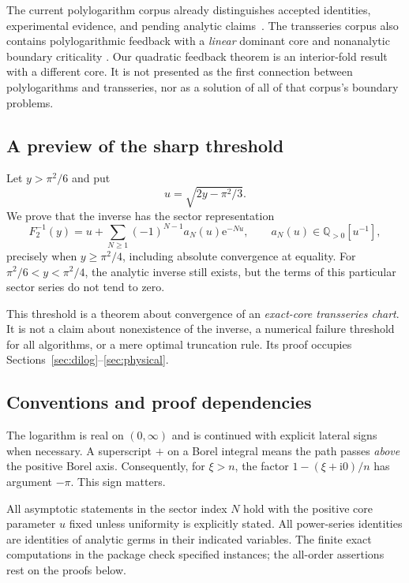 \documentclass[11pt,a4paper]{article}
\theoremstyle{definition}\newtheorem{definition}[theorem]{Definition}
\theoremstyle{remark}\newtheorem{remark}[theorem]{Remark}
\newcommand{\ii}{\mathrm i}
\newcommand{\ee}{\mathrm e}
\newcommand{\Q}{\mathbb Q}
\numberwithin{equation}{section}
\begin{document}
The current polylogarithm corpus already distinguishes accepted identities,
experimental evidence, and pending analytic claims~\cite{RepoPoly}.
The transseries corpus also contains polylogarithmic feedback with a
\emph{linear} dominant core and nonanalytic boundary criticality
\cite{RepoCritical}. Our quadratic feedback theorem is an interior-fold
result with a different core. It is not presented as the first connection
between polylogarithms and transseries, nor as a solution of all of that
corpus's boundary problems.

\subsection{A preview of the sharp threshold}

Let $y>\pi^2/6$ and put
\begin{equation}\label{eq:u-y}
 u=\sqrt{2y-\pi^2/3}.
\end{equation}
We prove that the inverse has the sector representation
\begin{equation}\label{eq:intro-inverse}
 F_2^{-1}(y)=u+\sum_{N\ge1}(-1)^{N-1}a_N(u)\ee^{-Nu},
 \qquad a_N(u)\in\Q_{>0}[u^{-1}],
\end{equation}
precisely when $y\ge\pi^2/4$, including absolute convergence at equality.
For $\pi^2/6<y<\pi^2/4$, the analytic inverse still exists, but the terms of
this particular sector series do not tend to zero.

This threshold is a theorem about convergence of an \emph{exact-core
transseries chart}. It is not a claim about nonexistence of the inverse,
a numerical failure threshold for all algorithms, or a mere optimal
truncation rule. Its proof occupies Sections~\ref{sec:dilog}--\ref{sec:physical}.

\subsection{Conventions and proof dependencies}

The logarithm is real on $(0,\infty)$ and is continued with explicit lateral
signs when necessary. A superscript $+$ on a Borel integral means the path
passes \emph{above} the positive Borel axis. Consequently, for $\xi>n$, the
factor $1-(\xi+\ii0)/n$ has argument $-\pi$. This sign matters.

All asymptotic statements in the sector index $N$ hold with the positive
core parameter $u$ fixed unless uniformity is explicitly stated. All
power-series identities are identities of analytic germs in their indicated
variables. The finite exact computations in the package check specified
instances; the all-order assertions rest on the proofs below.
\end{document}
